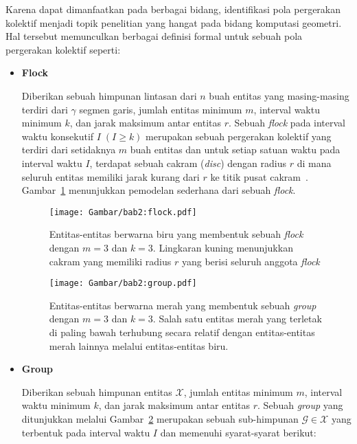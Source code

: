 Karena dapat dimanfaatkan pada berbagai bidang, identifikasi pola pergerakan kolektif menjadi topik penelitian yang hangat pada bidang komputasi geometri. Hal tersebut memunculkan berbagai definisi formal untuk sebuah pola pergerakan kolektif seperti:

\begin{itemize}
    \item \textbf{Flock}
    
    Diberikan sebuah himpunan lintasan dari $n$ buah entitas yang masing-masing terdiri dari $\gamma$ segmen garis, jumlah entitas minimum $m$, interval waktu minimum $k$, dan jarak maksimum antar entitas $r$. Sebuah \textit{flock} pada interval waktu konsekutif $I\;(I \geq k)$ merupakan sebuah pergerakan kolektif yang terdiri dari setidaknya $m$ buah entitas dan untuk setiap satuan waktu pada interval waktu $I$, terdapat sebuah cakram (\textit{disc}) dengan radius $r$ di mana seluruh entitas memiliki jarak kurang dari $r$ ke titik pusat cakram~\cite{gudmundsson:flock}. Gambar~\ref{bab2:flock} menunjukkan pemodelan sederhana dari sebuah \textit{flock}.
    
    \begin{figure}[h]
        \centering
        \captionsetup{width=0.75\textwidth}
        \texttt{[image: Gambar/bab2:flock.pdf]}
        \caption[Sebuah \textit{flock}]{Entitas-entitas berwarna biru yang membentuk sebuah \textit{flock} dengan $m = 3$ dan $k = 3$. Lingkaran kuning menunjukkan cakram yang memiliki radius $r$ yang berisi seluruh anggota \textit{flock}}
        \label{bab2:flock}
    \end{figure}
    
    \begin{figure}[h]
        \centering
        \captionsetup{width=0.75\textwidth}
        \texttt{[image: Gambar/bab2:group.pdf]}
        \caption[Sebuah \textit{group}]{Entitas-entitas berwarna merah yang membentuk sebuah \textit{group} dengan $m = 3$ dan $k = 3$. Salah satu entitas merah yang terletak di paling bawah terhubung secara relatif dengan entitas-entitas merah lainnya melalui entitas-entitas biru.}
        \label{bab2:group}
    \end{figure}
    
    \item \textbf{Group}
    
    Diberikan sebuah himpunan entitas $\mathcal{X}$, jumlah entitas minimum $m$, interval waktu minimum $k$, dan jarak maksimum antar entitas $r$. Sebuah \textit{group} yang ditunjukkan melalui Gambar~\ref{bab2:group} merupakan sebuah sub-himpunan $\mathcal{G} \in \mathcal{X}$ yang terbentuk pada interval waktu $I$ dan memenuhi syarat-syarat berikut:
    

\end{itemize}
